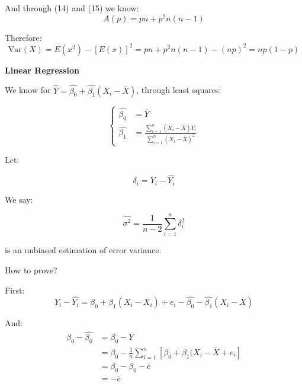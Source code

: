 \documentclass{article}
\newcommand{\Var}{\mathrm{Var}}
\begin{document}
And through (14) and (15) we know:
\begin{equation}
    A(p)=pn+p^2n(n-1)
\end{equation}

Therefore:
\begin{equation}
    \Var(X)=E(x^2)-[E(x)]^2=pn+p^2n(n-1)-(np)^2=np(1-p)
\end{equation}

\textbf{Linear Regression}

We know for \(\hat{Y}=\hat{\beta_0}+\hat{\beta_1}(X_i-\overline{X})\), through least squares:

\begin{equation}
\left\{
\begin{split}
\hat{\beta_0}&=\overline{Y}\\
\hat{\beta_1}&=\frac{\sum_{i=1}^n(X_i-\overline{X})Y_i}{\sum_{i=1}^n(X_i-\overline{X})^2}
\end{split}
\right.
\end{equation}

Let:

\begin{equation*}
    \delta_i=Y_i-\hat{Y_i}
\end{equation*}

We say:

\begin{equation*}
    \hat{\sigma^2}=\frac{1}{n-2}\sum_{i=1}^n\delta_i^2
\end{equation*}

is an unbiased estimation of error variance.

How to prove?

First:
\begin{equation}
    Y_i-\hat{Y_i}=\beta_0+\beta_1(X_i-\overline{X_i})+e_i-\hat{\beta_0}-\hat{\beta_1}(X_i-\overline{X})
\end{equation}

And:
\begin{equation}
    \begin{split}
    \beta_0-\hat{\beta_0}&=\beta_0-\overline{Y}\\
    &=\beta_0-\frac{1}{n}\sum_{i=1}^n[\beta_0+\beta_1(X_i-\overline{X}+e_i]\\
    &=\beta_0-\beta_0-\overline{e}\\
    &=-\overline{e}
    \end{split}
\end{equation}
\end{document}
